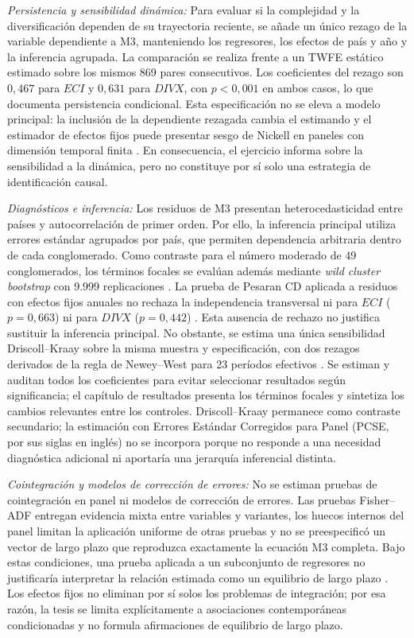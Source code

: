 \documentclass[../../TFM.tex]{subfiles}
\begin{document}
	\noindent\textit{Persistencia y sensibilidad dinámica:} Para evaluar si la
	complejidad y la diversificación dependen de su trayectoria reciente, se añade
	un único rezago de la variable dependiente a M3, manteniendo los regresores,
	los efectos de país y año y la inferencia agrupada. La comparación se realiza
	frente a un TWFE estático estimado sobre los mismos 869 pares consecutivos. Los
	coeficientes del rezago son $0{,}467$ para $ECI$ y $0{,}631$ para $DIVX$, con
	$p<0{,}001$ en ambos casos, lo que documenta persistencia condicional. Esta
	especificación no se eleva a modelo principal: la inclusión de la dependiente
	rezagada cambia el estimando y el estimador de efectos fijos puede presentar
	sesgo de Nickell en paneles con dimensión temporal finita
	\parencite{Nickell1981}. En consecuencia, el ejercicio informa sobre la
	sensibilidad a la dinámica, pero no constituye por sí solo una estrategia de
	identificación causal.

	\noindent\textit{Diagnósticos e inferencia:} Los residuos de M3 presentan
	heterocedasticidad entre países y autocorrelación de primer orden. Por ello,
	la inferencia principal utiliza errores estándar agrupados por país, que
	permiten dependencia arbitraria dentro de cada conglomerado. Como contraste
	para el número moderado de 49 conglomerados, los términos focales se evalúan
	además mediante \textit{wild cluster bootstrap} con 9.999 replicaciones
	\parencite{Cameron2008, Roodman2019}.
	La prueba de Pesaran CD aplicada a residuos con efectos fijos anuales no
	rechaza la independencia transversal ni para $ECI$ ($p=0{,}663$) ni para
	$DIVX$ ($p=0{,}442$) \parencite{Pesaran2004}. Esta ausencia de rechazo no
	justifica sustituir la inferencia principal. No obstante, se estima una única
	sensibilidad Driscoll--Kraay sobre la misma muestra y especificación, con dos
	rezagos derivados de la regla de Newey--West para 23 períodos efectivos
	\parencite{Driscoll1998, NeweyWest1994}. Se estiman y auditan todos los
	coeficientes para evitar seleccionar resultados según significancia; el
	capítulo de resultados presenta los términos focales y sintetiza los cambios
	relevantes entre los controles. Driscoll--Kraay permanece
	como contraste secundario; la estimación con Errores Estándar Corregidos
	para Panel (PCSE, por sus siglas en inglés) no se incorpora porque no responde a una
	necesidad diagnóstica adicional ni aportaría una jerarquía inferencial distinta.

	\noindent\textit{Cointegración y modelos de corrección de errores:} No se estiman
	pruebas de cointegración en panel ni modelos de corrección de errores. Las
	pruebas Fisher--ADF entregan evidencia mixta entre variables y variantes, los
	huecos internos del panel limitan la aplicación uniforme de otras pruebas y
	no se preespecificó un vector de largo plazo que reproduzca exactamente la
	ecuación M3 completa. Bajo estas condiciones, una prueba aplicada a un
	subconjunto de regresores no justificaría interpretar la relación estimada
	como un equilibrio de largo plazo \parencite{Pedroni1999, Kao1999}. Los efectos fijos no eliminan por sí solos los problemas
	de integración; por esa razón, la tesis se limita explícitamente a
	asociaciones contemporáneas condicionadas y no formula afirmaciones de
	equilibrio de largo plazo.
\end{document}
